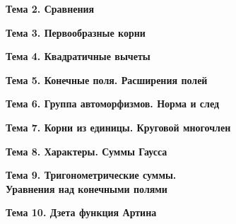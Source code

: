 \documentclass[a4paper, 12pt]{article}
\begin{document}


\begin{center} {\bf Тема 2. Сравнения} \end{center}



\begin{center} {\bf Тема 3. Первообразные корни} \end{center}



\begin{center} {\bf Тема 4. Квадратичные вычеты} \end{center}



\begin{center} {\bf Тема 5. Конечные поля. Расширения полей} \end{center}



\begin{center} {\bf Тема 6. Группа автоморфизмов. Норма и след} \end{center}



\begin{center} {\bf Тема 7. Корни из единицы. Круговой многочлен} \end{center}



\begin{center} {\bf Тема 8. Характеры. Суммы Гаусса} \end{center}



\begin{center} {\bf Тема 9. Тригонометрические суммы.\\ Уравнения над конечными полями} \end{center}



\begin{center} {\bf Тема 10. Дзета функция Артина} \end{center}


\end{document}
